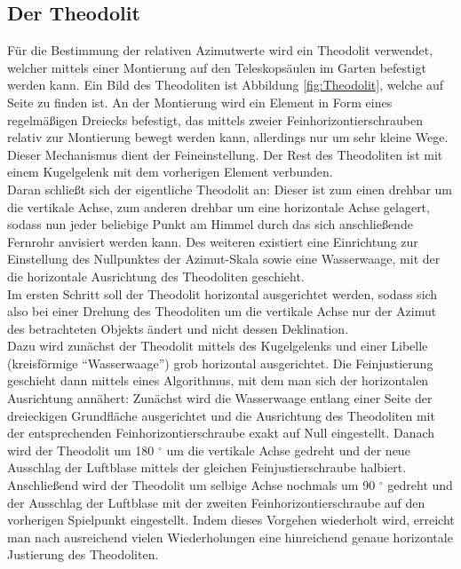 \subsection{Der Theodolit}
Für die Bestimmung der relativen Azimutwerte wird ein Theodolit verwendet, welcher mittels einer Montierung auf den Teleskopsäulen im Garten befestigt werden kann. Ein Bild des Theodoliten ist Abbildung \ref{fig:Theodolit}, welche auf Seite \pageref{fig:Theodolit} zu finden ist. An der Montierung wird ein Element in Form eines regelmäßigen Dreiecks befestigt, das mittels zweier Feinhorizontierschrauben relativ zur Montierung bewegt werden kann, allerdings nur um sehr kleine Wege. Dieser Mechanismus dient der Feineinstellung. Der Rest des Theodoliten ist mit einem Kugelgelenk mit dem vorherigen Element verbunden. \\
Daran schließt sich der eigentliche Theodolit an: Dieser ist zum einen drehbar um die vertikale Achse, zum anderen drehbar um eine horizontale Achse gelagert, sodass nun jeder beliebige Punkt am Himmel durch das sich anschließende Fernrohr anvisiert werden kann.  Des weiteren existiert eine Einrichtung zur Einstellung des Nullpunktes der Azimut-Skala sowie eine Wasserwaage, mit der die horizontale Ausrichtung des Theodoliten geschieht. \\
Im ersten Schritt soll der Theodolit horizontal ausgerichtet werden, sodass sich also bei einer Drehung des Theodoliten um die vertikale Achse nur der Azimut des betrachteten Objekts ändert und nicht dessen Deklination.\\
Dazu wird zunächst der Theodolit mittels des Kugelgelenks und einer Libelle (kreisförmige \enquote{Wasserwaage}) grob horizontal ausgerichtet. Die Feinjustierung geschieht dann mittels eines Algorithmus, mit dem man sich der horizontalen Ausrichtung annähert: Zunächst wird die Wasserwaage entlang einer Seite der dreieckigen Grundfläche ausgerichtet und die Ausrichtung des Theodoliten mit der entsprechenden Feinhorizontierschraube exakt auf Null eingestellt. Danach wird der Theodolit um 180 $^\circ$ um die vertikale Achse gedreht und der neue Ausschlag der Luftblase mittels der gleichen Feinjustierschraube halbiert. Anschließend wird der Theodolit um selbige Achse nochmals um 90 $^\circ$ gedreht und der Ausschlag der Luftblase mit der zweiten Feinhorizontierschraube auf den vorherigen Spielpunkt eingestellt. Indem dieses Vorgehen wiederholt wird, erreicht man nach ausreichend vielen Wiederholungen eine hinreichend genaue horizontale Justierung des Theodoliten. \\

